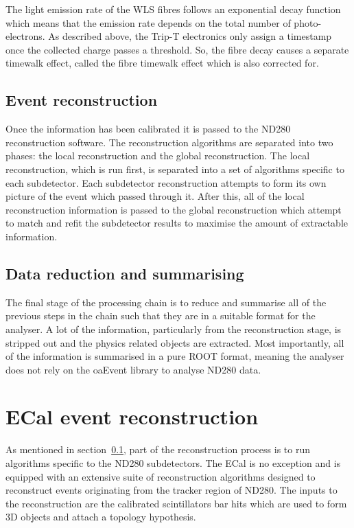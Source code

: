 \newline
\newline
The light emission rate of the WLS fibres follows an exponential decay function which means that the emission rate depends on the total number of photo-electrons.  As described above, the Trip-T electronics only assign a timestamp once the collected charge passes a threshold.  So, the fibre decay causes a separate timewalk effect, called the fibre timewalk effect which is also corrected for.  
\subsection{Event reconstruction}
\label{subsec:EventReconstruction}
Once the information has been calibrated it is passed to the ND280 reconstruction software.  The reconstruction algorithms are separated into two phases: the local reconstruction and the global reconstruction.  The local reconstruction, which is run first, is separated into a set of algorithms specific to each subdetector.  Each subdetector reconstruction attempts to form its own picture of the event which passed through it.  After this, all of the local reconstruction information is passed to the global reconstruction which attempt to match and refit the subdetector results to maximise the amount of extractable information.

\subsection{Data reduction and summarising}
\label{subsec:DataReduction}
The final stage of the processing chain is to reduce and summarise all of the previous steps in the chain such that they are in a suitable format for the analyser.  A lot of the information, particularly from the reconstruction stage, is stripped out and the physics related objects are extracted.  Most importantly, all of the information is summarised in a pure ROOT format, meaning the analyser does not rely on the oaEvent library to analyse ND280 data.


\section{ECal event reconstruction}
\label{sec:ECalEventReconstruction}
As mentioned in section~\ref{subsec:EventReconstruction}, part of the reconstruction process is to run algorithms specific to the ND280 subdetectors.  The ECal is no exception and is equipped with an extensive suite of reconstruction algorithms designed to reconstruct events originating from the tracker region of ND280.  The inputs to the reconstruction are the calibrated scintillators bar hits which are used to form 3D objects and attach a topology hypothesis.

